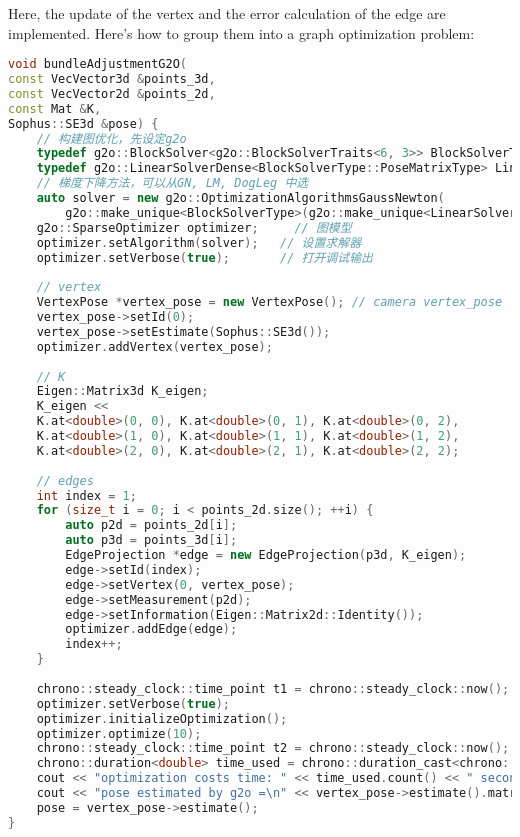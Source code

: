 Here, the update of the vertex and the error calculation of the edge are implemented. Here's how to group them into a graph optimization problem:
\begin{lstlisting}[language=c++,caption=slambook2/ch7/pose_estimation_3d2d.cpp（片段）]
void bundleAdjustmentG2O(
const VecVector3d &points_3d,
const VecVector2d &points_2d,
const Mat &K,
Sophus::SE3d &pose) {
	// 构建图优化，先设定g2o
	typedef g2o::BlockSolver<g2o::BlockSolverTraits<6, 3>> BlockSolverType;  // pose is 6, landmark is 3
	typedef g2o::LinearSolverDense<BlockSolverType::PoseMatrixType> LinearSolverType; // 线性求解器类型
	// 梯度下降方法，可以从GN, LM, DogLeg 中选
	auto solver = new g2o::OptimizationAlgorithmsGaussNewton(
		g2o::make_unique<BlockSolverType>(g2o::make_unique<LinearSolverType>()));
	g2o::SparseOptimizer optimizer;     // 图模型
	optimizer.setAlgorithm(solver);   // 设置求解器
	optimizer.setVerbose(true);       // 打开调试输出
	
	// vertex
	VertexPose *vertex_pose = new VertexPose(); // camera vertex_pose
	vertex_pose->setId(0);
	vertex_pose->setEstimate(Sophus::SE3d());
	optimizer.addVertex(vertex_pose);
	
	// K
	Eigen::Matrix3d K_eigen;
	K_eigen <<
	K.at<double>(0, 0), K.at<double>(0, 1), K.at<double>(0, 2),
	K.at<double>(1, 0), K.at<double>(1, 1), K.at<double>(1, 2),
	K.at<double>(2, 0), K.at<double>(2, 1), K.at<double>(2, 2);
	
	// edges
	int index = 1;
	for (size_t i = 0; i < points_2d.size(); ++i) {
		auto p2d = points_2d[i];
		auto p3d = points_3d[i];
		EdgeProjection *edge = new EdgeProjection(p3d, K_eigen);
		edge->setId(index);
		edge->setVertex(0, vertex_pose);
		edge->setMeasurement(p2d);
		edge->setInformation(Eigen::Matrix2d::Identity());
		optimizer.addEdge(edge);
		index++;
	}
	
	chrono::steady_clock::time_point t1 = chrono::steady_clock::now();
	optimizer.setVerbose(true);
	optimizer.initializeOptimization();
	optimizer.optimize(10);
	chrono::steady_clock::time_point t2 = chrono::steady_clock::now();
	chrono::duration<double> time_used = chrono::duration_cast<chrono::duration<double>>(t2 - t1);
	cout << "optimization costs time: " << time_used.count() << " seconds." << endl;
	cout << "pose estimated by g2o =\n" << vertex_pose->estimate().matrix() << endl;
	pose = vertex_pose->estimate();
}
\end{lstlisting}

